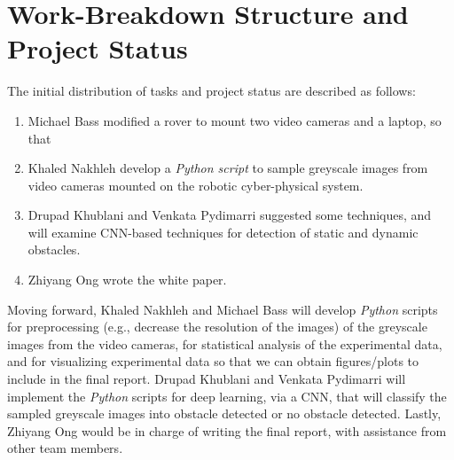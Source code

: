 \documentclass[letter,12pt]{article}
\begin{document}


\section{Work-Breakdown Structure and Project Status}
\label{sec:WorkBreakdownStructureAndProjectStatus}

The initial distribution of tasks and project status are described as follows: \vspace{-0.3cm}
\begin{enumerate} \itemsep -4pt
\item Michael Bass modified a rover to mount two video cameras and a laptop, so that 
\item Khaled Nakhleh develop a {\it Python script} to sample greyscale images from video cameras mounted on the robotic cyber-physical system.
\item Drupad Khublani and Venkata Pydimarri suggested some techniques, and will examine CNN-based techniques for detection of static and dynamic obstacles.
\item Zhiyang Ong wrote the white paper.
\end{enumerate}

Moving forward, Khaled Nakhleh and Michael Bass will develop {\it Python} scripts for preprocessing (e.g., decrease the resolution of the images) of the greyscale images from the video cameras, for statistical analysis of the experimental data, and for visualizing experimental data so that we can obtain figures/plots to include in the final report. Drupad Khublani and Venkata Pydimarri will implement the {\it Python} scripts for deep learning, via a CNN, that will classify the sampled greyscale images into obstacle detected or no obstacle detected. Lastly, Zhiyang Ong would be in charge of writing the final report, with assistance from other team members.
\end{document}
